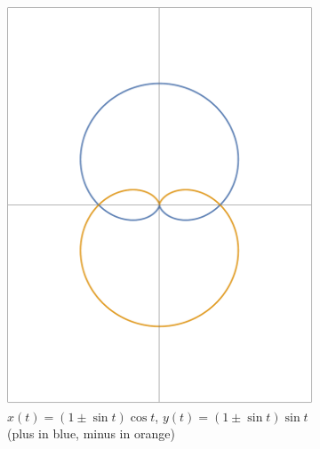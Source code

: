\documentclass[12pt]{article}
\begin{document}
	\begin{figure}[h!]
		\centering
		\begin{subfigure}[t]{0.5\textwidth}
			\centering
			\includegraphics[scale=0.5125]{6_Limacons2}
			\caption{$x(t)=(1\pm\sin{t})\cos{t}$, 
				$y(t)=(1\pm\sin{t})\sin{t}$\newline(plus in blue, minus in orange)}
		\end{subfigure}%
		~ 
		\begin{subfigure}[t]{0.5\textwidth}
			\centering

\end{subfigure}
\end{figure}
\end{document}
